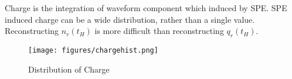 Charge is the integration of waveform component which induced by SPE. SPE induced charge can be a wide distribution, rather than a single value. Reconstructing $n_{r}(t_{H})$ is more difficult than reconstructing $q_{r}(t_{H})$. 

\begin{figure}[H]
    \centering
    \texttt{[image: figures/chargehist.png]}
    \caption{\label{fig:charge} Distribution of Charge}
\end{figure}

